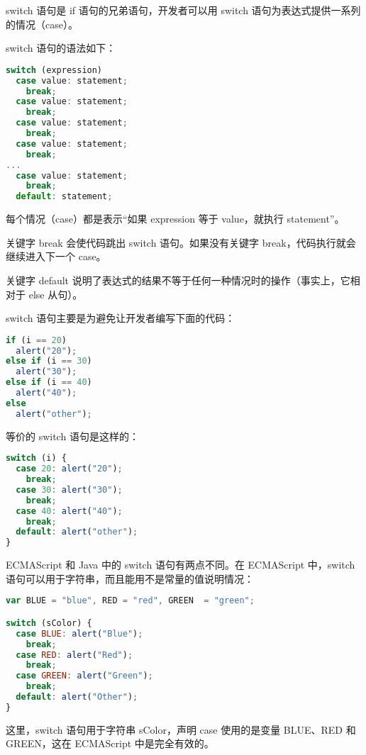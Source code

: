 switch 语句是 if 语句的兄弟语句，开发者可以用 switch 语句为表达式提供一系列的情况（case）。


switch 语句的语法如下：


\begin{lstlisting}[language=JavaScript]
switch (expression)
  case value: statement;
    break;
  case value: statement;
    break;
  case value: statement;
    break;
  case value: statement;
    break;
...
  case value: statement;
    break;
  default: statement;
\end{lstlisting}


每个情况（case）都是表示“如果 expression 等于 value，就执行 statement”。

关键字 break 会使代码跳出 switch 语句。如果没有关键字 break，代码执行就会继续进入下一个 case。

关键字 default 说明了表达式的结果不等于任何一种情况时的操作（事实上，它相对于 else 从句）。

switch 语句主要是为避免让开发者编写下面的代码：


\begin{lstlisting}[language=JavaScript]
if (i == 20)
  alert("20");
else if (i == 30)
  alert("30");
else if (i == 40)
  alert("40");
else
  alert("other");
\end{lstlisting}


等价的 switch 语句是这样的：


\begin{lstlisting}[language=JavaScript]
switch (i) {
  case 20: alert("20");
    break;
  case 30: alert("30");
    break;
  case 40: alert("40");
    break;
  default: alert("other");
}
\end{lstlisting}

ECMAScript 和 Java 中的 switch 语句有两点不同。在 ECMAScript 中，switch 语句可以用于字符串，而且能用不是常量的值说明情况：

\begin{lstlisting}[language=JavaScript]
var BLUE = "blue", RED = "red", GREEN  = "green";

switch (sColor) {
  case BLUE: alert("Blue");
    break;
  case RED: alert("Red");
    break;
  case GREEN: alert("Green");
    break;
  default: alert("Other");
}
\end{lstlisting}

这里，switch 语句用于字符串 sColor，声明 case 使用的是变量 BLUE、RED 和 GREEN，这在 ECMAScript 中是完全有效的。







